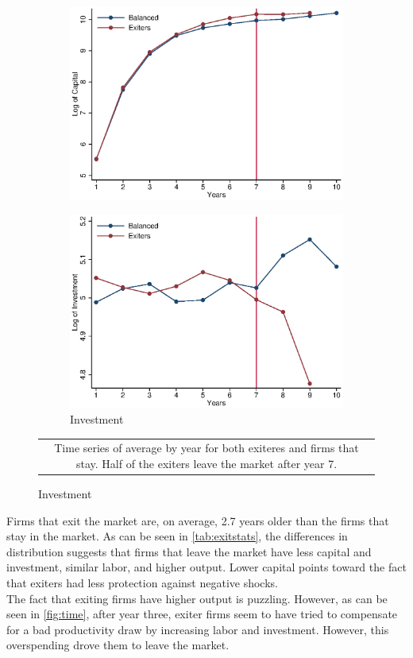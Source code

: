 \documentclass[11pt]{article}
\begin{document}
\begin{figure}[ht]
\begin{subfigure}[b]{.3\textwidth}
		\includegraphics[width=\textwidth]{../out/timeK.eps}
	\end{subfigure}
	\begin{subfigure}[b]{.3\textwidth}
		\centering
		\caption{Investment}
		\includegraphics[width=\textwidth]{../out/timeI.eps}
	\end{subfigure}
\begin{tabular*}{1\textwidth}{c}
	\multicolumn{1}{p{1\hsize}}{\footnotesize Time series of average by year for both exiteres and firms that stay. Half of the exiters leave the market after year 7.}\\
\end{tabular*}      	  
\end{figure}

Firms that exit the market are, on average, 2.7 years older than the firms that stay in the market. As can be seen in \autoref{tab:exitstats}, the differences in distribution suggests that firms that leave the market have less capital and investment, similar labor, and higher output. Lower capital points toward the fact that exiters had less protection against negative shocks. \\
The fact that exiting firms have higher output is puzzling. However, as can be seen in \autoref{fig:time}, after year three, exiter firms seem to have tried to compensate for a bad productivity draw by increasing labor and investment. However, this overspending drove them to leave the market.
\end{document}
